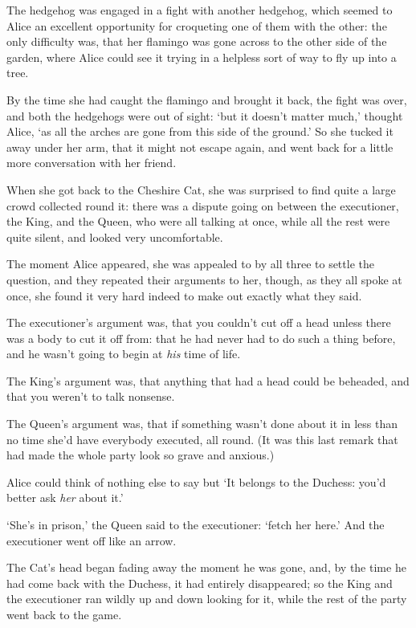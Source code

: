   The hedgehog was engaged in a fight with another hedgehog,
which seemed to Alice an excellent opportunity for croqueting one
of them with the other:  the only difficulty was, that her
flamingo was gone across to the other side of the garden, where
Alice could see it trying in a helpless sort of way to fly up
into a tree.

  By the time she had caught the flamingo and brought it back,
the fight was over, and both the hedgehogs were out of sight:
`but it doesn't matter much,' thought Alice, `as all the arches
are gone from this side of the ground.'  So she tucked it away
under her arm, that it might not escape again, and went back for
a little more conversation with her friend.

  When she got back to the Cheshire Cat, she was surprised to
find quite a large crowd collected round it:  there was a dispute
going on between the executioner, the King, and the Queen, who
were all talking at once, while all the rest were quite silent,
and looked very uncomfortable.

  The moment Alice appeared, she was appealed to by all three to
settle the question, and they repeated their arguments to her,
though, as they all spoke at once, she found it very hard indeed
to make out exactly what they said.

  The executioner's argument was, that you couldn't cut off a
head unless there was a body to cut it off from:  that he had
never had to do such a thing before, and he wasn't going to begin
at {\it his} time of life.

  The King's argument was, that anything that had a head could be
beheaded, and that you weren't to talk nonsense.

  The Queen's argument was, that if something wasn't done about
it in less than no time she'd have everybody executed, all round.
(It was this last remark that had made the whole party look so
grave and anxious.)

  Alice could think of nothing else to say but `It belongs to the
Duchess:  you'd better ask {\it her} about it.'

  `She's in prison,' the Queen said to the executioner:  `fetch
her here.'  And the executioner went off like an arrow.

   The Cat's head began fading away the moment he was gone, and,
by the time he had come back with the Duchess, it had entirely
disappeared; so the King and the executioner ran wildly up and down
looking for it, while the rest of the party went back to the game.



